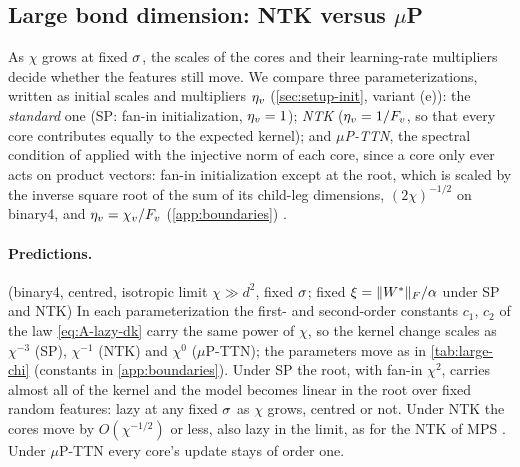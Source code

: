 \subsection{Large bond dimension: NTK versus \texorpdfstring{$\mu$P}{muP}}\label{sec:other-large-chi}

As $\chi$ grows at fixed $\sigma$, the scales of the cores and their learning-rate multipliers decide whether the
features still move. We compare three parameterizations, written as initial scales and multipliers $\eta_{v}$
(\cref{sec:setup-init}, variant (e)): the \emph{standard} one (SP: fan-in initialization, $\eta_{v}=1$); \emph{NTK}
($\eta_{v}=1/F_{v}$, so that every core contributes equally to the expected kernel); and \emph{$\mu$P-TTN}, the
spectral condition of \citet{yang2024spectral} applied with the injective norm of each core, since a core only
ever acts on product vectors: fan-in initialization except at the root, which is scaled by the inverse square root
of the sum of its child-leg dimensions, $(2\chi)^{-1/2}$ on binary4, and $\eta_{v}=\chi_{v}/F_{v}$
(\cref{app:boundaries}) \derived{} .

\paragraph{Predictions.}
\derived{} (binary4, centred, isotropic limit $\chi\gg d^2$, fixed $\sigma$; fixed $\xi=\lVert W^{*}\rVert_{F}/\alpha$ under SP and NTK)
In each parameterization
the first- and second-order constants $c_1$, $c_2$ of the law \eqref{eq:A-lazy-dk} carry the same power of $\chi$, so
the kernel change scales as $\chi^{-3}$ (SP), $\chi^{-1}$ (NTK) and $\chi^0$ ($\mu$P-TTN); the parameters move as in
\cref{tab:large-chi} (constants in \cref{app:boundaries}). Under SP the root, with fan-in $\chi^2$, carries almost all
of the kernel and the model becomes linear in the root over fixed random features: lazy at any fixed $\sigma$ as
$\chi$ grows, centred or not. Under NTK the cores move by $O(\chi^{-1/2})$ or less, also lazy in the limit, as for
the NTK of MPS . Under $\mu$P-TTN every core's update stays of order one.

